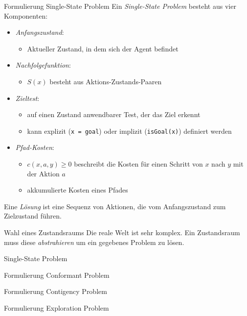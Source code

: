 \begin{defi}{Formulierung Single-State Problem}
    Ein \emph{Single-State Problem} besteht aus vier Komponenten:
    \begin{itemize}
        \item \emph{Anfangszustand}:
              \begin{itemize}
                  \item Aktueller Zustand, in dem sich der Agent befindet
              \end{itemize}
        \item \emph{Nachfolgefunktion}:
              \begin{itemize}
                  \item $S(x)$ besteht aus Aktions-Zustands-Paaren
              \end{itemize}
        \item \emph{Zieltest}:
              \begin{itemize}
                  \item auf einen Zustand anwendbarer Test, der das Ziel erkennt
                  \item kann explizit (\texttt{x = goal}) oder implizit (\texttt{isGoal(x)}) definiert werden
              \end{itemize}
        \item \emph{Pfad-Kosten}:
              \begin{itemize}
                  \item $c(x,a,y) \geq 0$ beschreibt die Kosten für einen Schritt von $x$ nach $y$ mit der Aktion $a$
                  \item akkumulierte Kosten eines Pfades
              \end{itemize}
    \end{itemize}

    Eine \emph{Lösung} ist eine Sequenz von Aktionen, die vom Anfangszustand zum Zielzustand führen.
\end{defi}

\begin{bonus}{Wahl eines Zustandsraums}
    Die reale Welt ist sehr komplex.
    Ein Zustandsraum muss diese \emph{abstrahieren} um ein gegebenes Problem zu lösen.
\end{bonus}

\begin{example}{Single-State Problem}

\end{example}

\begin{defi}{Formulierung Conformant Problem}

\end{defi}

\begin{defi}{Formulierung Contigency Problem}

\end{defi}

\begin{defi}{Formulierung Exploration Problem}

\end{defi}